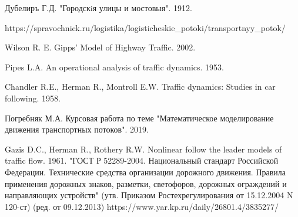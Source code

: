 \documentclass[12pt, a4paper]{extarticle}
\numberwithin{equation}{section}
\begin{document}
\begin{thebibliography}{**}
	Дубелиръ Г.Д. "Городскiя улицы и мостовыя". 1912.
	
	https://spravochnick.ru/logistika/logisticheskie\_potoki/transportnyy\_potok/
	
	Wilson R. E. Gipps’ Model of Highway Traffic. 2002.
	
	Pipes L.A. An operational analysis of traffic dynamics. 1953. 
	
	Chandler R.E., Herman R., Montroll E.W. Traffic dynamics: Studies in car following. 1958.
	
	Погребняк М.А. Курсовая работа по теме "Математическое моделирование движения транспортных потоков". 2019.
	
	Gazis D.C., Herman R., Rothery R.W. Nonlinear follow the leader models of traffic
flow. 1961.
	"ГОСТ Р 52289-2004. Национальный стандарт Российской Федерации. Технические средства организации дорожного движения. Правила применения дорожных знаков, разметки, светофоров, дорожных ограждений и направляющих устройств" (утв. Приказом Ростехрегулирования от 15.12.2004 N 120-ст) (ред. от 09.12.2013)
	https://www.yar.kp.ru/daily/26801.4/3835277/
\end{thebibliography}
\end{document}
